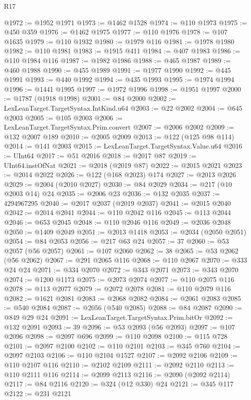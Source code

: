 \begin{lexlean}{R17}
\begin{coremodule}
{{{{{{{{{{{{{{{{{{{{{{{{{{{{{{{{{{{{{{{{{{{{{{{{{{{{{{{{{{{{{{{{{{{{{{{{{{{{{{{{{{{{{@1972 := @1952 @1971
@1973 := @1462 @1528
@1974 := @110 @1973
@1975 := @450 @359
@1976 := @1462 @1975
@1977 := @110 @1976
@1978 := @107 @1635
@1979 := @110 @1932
@1980 := @1979 @116
@1981 := @1978 @1980
@1982 := @110 @1981
@1983 := @1915 @411
@1984 := @407 @1983
@1986 := @110 @1984 @116
@1987 := @1982 @1986
@1988 := @465 @1987
@1989 := @460 @1988
@1990 := @455 @1989
@1991 := @1977 @1990
@1992 := @445 @1991
@1993 := @440 @1992
@1994 := @435 @1993
@1995 := @1974 @1994
@1996 := @1441 @1995
@1997 := @1972 @1996
@1998 := @1951 @1997
@2000 := @1787 (@1918 @1998)
@2001 := @84 @2000
@2002 := LexLeanTarget.TargetSyntax.IntKind.u64
@2003 := @22 @2002
@2004 := @645 @2003
@2005 := @105 @2003
@2006 := LexLeanTarget.TargetSyntax.Prim.convert
@2007 := @2006 @2002
@2009 := @132 @2007 @189
@2010 := @2005 @2009
@2013 := @122 (@125 @98 @114)
@2014 := @141 @2003
@2015 := LexLeanTarget.TargetSyntax.Value.u64
@2016 := UInt64
@2017 := @51 @2016
@2018 := @2017 @87
@2019 := UInt64.instOfNat
@2021 := @2018 (@2019 @87)
@2022 := @2015 @2021
@2023 := @2014 @2022
@2026 := @122 (@168 @2023) @174
@2027 := @2013 @2026
@2029 := @2004 (@2010 @2027)
@2030 := @84 @2029
@2034 := @217 (@10 @2003 @14) @24
@2035 := @2006 @23
@2036 := @132 @2035
@2037 := 4294967295
@2040 := @2017 @2037 (@2019 @2037)
@2041 := @2015 @2040
@2042 := @2014 @2041
@2044 := @110 @2042 @116
@2045 := @113 @2044
@2046 := @653 @2045
@2048 := @110 @2046 @116
@2049 := @2036 @2048
@2050 := @1409 @2049
@2051 := @2013 @1418
@2053 := @2034 (@2050 @2051)
@2054 := @84 @2053
@2056 := @217 @63 @24
@2057 := 37
@2060 := @53 @2057 (@56 @2057)
@2061 := @107 @2060
@2062 := 38
@2065 := @53 @2062 (@56 @2062)
@2067 := @291 @2065 @116
@2068 := @110 @2067
@2070 := @333 @24 @24
@2071 := @334 @2070
@2072 := @343 @2071
@2073 := @343 @2070
@2074 := @1200 @1173
@2075 := @2073 @2074
@2077 := @110 @2075 @116
@2078 := @113 @2077
@2079 := @2072 @2078
@2081 := @110 @2079 @116
@2082 := @1621 @2081
@2083 := @2068 @2082
@2084 := @2061 @2083
@2085 := @540 @2084
@2087 := @2056 (@540 @2085)
@2088 := @84 @2087
@2090 := @849 @29 @24
@2091 := LexLeanTarget.TargetSyntax.Prim.bitOr
@2092 := @132 @2091
@2093 := 39
@2096 := @53 @2093 (@56 @2093)
@2097 := @107 @2096
@2098 := @2097 @696
@2099 := @110 @2098
@2100 := @115 @728
@2101 := @2097 @2100
@2102 := @110 @2101
@2103 := @345 @760
@2104 := @2097 @2103
@2106 := @110 @2104 @1527
@2107 := @2092 @2106
@2109 := @110 @2107 @116
@2110 := @2102 @2109
@2111 := @2092 @2110
@2113 := @110 @2111 @116
@2114 := @2099 @2113
@2116 := @2090 (@2092 @2114)
@2117 := @84 @2116
@2120 := @324 (@12 @330) @24
@2121 := @345 @117
@2122 := @231 @2121
}}}}}}}}}}}}}}}}}}}}}}}}}}}}}}}}}}}}}}}}}}}}}}}}}}}}}}}}}}}}}}}}}}}}}}}}}}}}}}}}}}}}}
\end{coremodule}
\end{lexlean}
